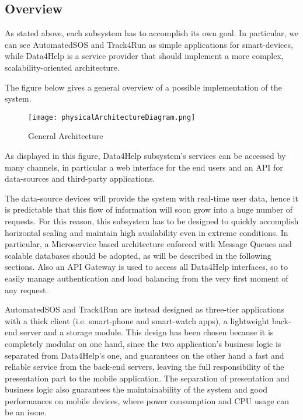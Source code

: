 \subsection{Overview}
As stated above, each subsystem has to accomplish its own goal. In particular, we can see AutomatedSOS and Track4Run as simple  applications for smart-devices, while Data4Help is a service provider that should implement a more complex, scalability-oriented architecture.

The figure below gives a general overview of a possible implementation of the system.

\FloatBarrier

\begin{figure}[!h]
	\centering
	\texttt{[image: physicalArchitectureDiagram.png]}
	\caption{General Architecture}
\end{figure}


\FloatBarrier

As displayed in this figure, Data4Help subsystem's services can be accessed by many channels, in particular a web interface for the end users and an API for data-sources and third-party applications.

The data-source devices will provide the system with real-time user data, hence it is predictable that this flow of information will soon grow into a huge number of requests. For this reason, this subsystem has to be designed to quickly accomplish horizontal scaling and maintain high availability even in extreme conditions.
In particular, a Microservice based architecture enforced with Message Queues and scalable databases should be adopted, as will be described in the following sections. Also an API Gateway is used to access all Data4Help interfaces, so to easily manage authentication and load balancing from the very first moment of any request.

AutomatedSOS and Track4Run are instead designed as three-tier applications with a thick client (i.e. smart-phone and smart-watch apps), a lightweight back-end server and a storage module. This design has been chosen because it is completely modular on one hand, since the two application's business logic is separated from Data4Help's one, and guarantees on the other hand a fast and reliable service from the back-end servers, leaving the full responsibility of the presentation part to the mobile application. The separation of presentation and business logic also guarantees the maintainability of the system and good performances on mobile devices, where power consumption and CPU usage can be an issue.

